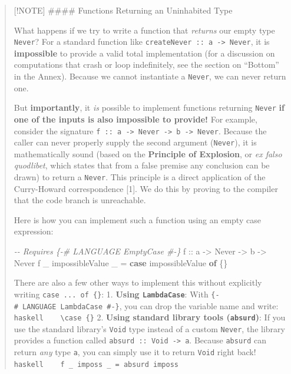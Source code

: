 \documentclass[
]{article}
\newenvironment{Shaded}{}{}
\newcommand{\CommentTok}[1]{\textcolor[rgb]{0.38,0.63,0.69}{\textit{#1}}}
\newcommand{\DataTypeTok}[1]{\textcolor[rgb]{0.56,0.13,0.00}{#1}}
\newcommand{\KeywordTok}[1]{\textcolor[rgb]{0.00,0.44,0.13}{\textbf{#1}}}
\newcommand{\NormalTok}[1]{#1}
\newcommand{\OtherTok}[1]{\textcolor[rgb]{0.00,0.44,0.13}{#1}}
\begin{document}
\begin{quote}
{[}!NOTE{]} \#\#\#\# Functions Returning an Uninhabited Type

What happens if we try to write a function that \emph{returns} our empty
type \texttt{Never}? For a standard function like
\texttt{createNever\ ::\ a\ -\textgreater{}\ Never}, it is
\textbf{impossible} to provide a valid total implementation (for a
discussion on computations that crash or loop indefinitely, see the
section on ``Bottom'' in the Annex). Because we cannot instantiate a
\texttt{Never}, we can never return one.

But \textbf{importantly}, it \emph{is} possible to implement functions
returning \texttt{Never} \textbf{if one of the inputs is also impossible
to provide!} For example, consider the signature
\texttt{f\ ::\ a\ -\textgreater{}\ Never\ -\textgreater{}\ b\ -\textgreater{}\ Never}.
Because the caller can never properly supply the second argument
(\texttt{Never}), it is mathematically sound (based on the
\textbf{Principle of Explosion}, or \emph{ex falso quodlibet}, which
states that from a false premise any conclusion can be drawn) to return
a \texttt{Never}. This principle is a direct application of the
Curry-Howard correspondence {[}1{]}. We do this by proving to the
compiler that the code branch is unreachable.

Here is how you can implement such a function using an empty case
expression:

\begin{Shaded}
\begin{Highlighting}[]
\CommentTok{{-}{-} Requires \{{-}\# LANGUAGE EmptyCase \#{-}\}}
\OtherTok{f ::}\NormalTok{ a }\OtherTok{{-}\textgreater{}} \DataTypeTok{Never} \OtherTok{{-}\textgreater{}}\NormalTok{ b }\OtherTok{{-}\textgreater{}} \DataTypeTok{Never}
\NormalTok{f \_ impossibleValue \_ }\OtherTok{=} \KeywordTok{case}\NormalTok{ impossibleValue }\KeywordTok{of}\NormalTok{ \{\}}
\end{Highlighting}
\end{Shaded}

There are also a few other ways to implement this without explicitly
writing \texttt{case\ ...\ of\ \{\}}: 1. \textbf{Using
\texttt{LambdaCase}}: With \texttt{\{-\#\ LANGUAGE\ LambdaCase\ \#-\}},
you can drop the variable name and write:
\texttt{haskell\ \ \ \ \textbackslash{}case\ \{\}} 2. \textbf{Using
standard library tools (\texttt{absurd})}: If you use the standard
library's \texttt{Void} type instead of a custom \texttt{Never}, the
library provides a function called
\texttt{absurd\ ::\ Void\ -\textgreater{}\ a}. Because \texttt{absurd}
can return \emph{any} type \texttt{a}, you can simply use it to return
\texttt{Void} right back!
\texttt{haskell\ \ \ \ f\ \_\ imposs\ \_\ =\ absurd\ imposs}


\end{quote}
\end{document}
